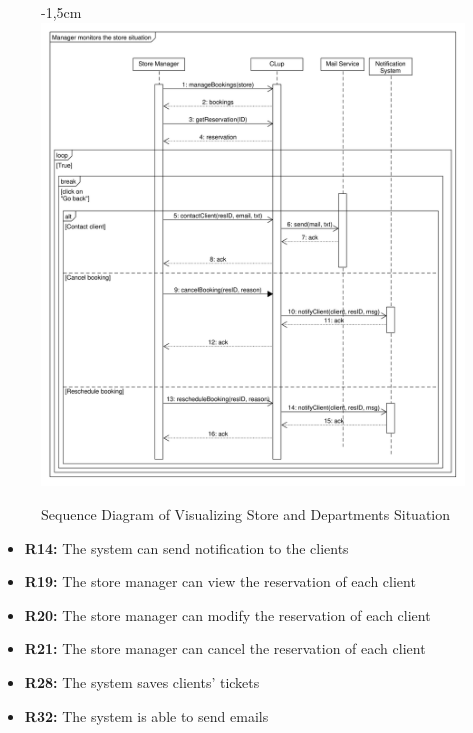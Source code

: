 \documentclass{article}
\begin{document}
\begin{center}
\begin{adjustwidth}{-2.8cm}{}
\begin{tabular}[h!]{|m{7.5em}|m{36em}|}
						\end{tabular}
					\end{adjustwidth}
				\newpage
					\begin{figure}[!h]
						\begin{adjustwidth} {-1,5cm}{}
							\centering
							\includegraphics[scale=0.42]{SD/9_manageReservations(store)}\\
							\caption{Sequence Diagram of Visualizing Store and Departments Situation}
						\end{adjustwidth}
					\end{figure}
					\begin{itemize}
						\medskip
						
						{\bfseries Required functional requirements: }
						
						\item {\bfseries R14: } The system can send notiﬁcation to the clients
						\item {\bfseries R19: }  The store manager can view the reservation of each client
						\item {\bfseries R20: } The store manager can modify the reservation of each client
						\item {\bfseries R21: } The store manager can cancel the reservation of each client
						\item {\bfseries R28: } The system saves clients' tickets
						\item {\bfseries R32: } The system is able to send emails
						

					\end{itemize}	
					
				\end{center}
			
\end{document}
